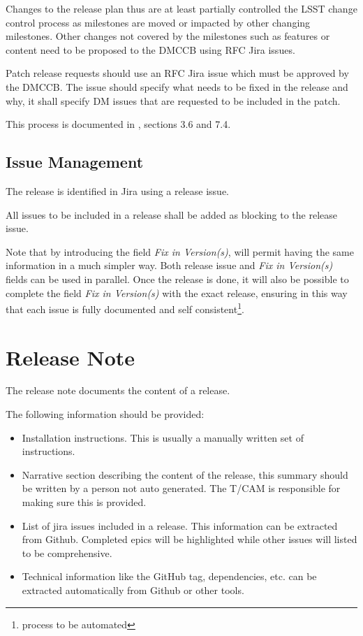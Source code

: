 Changes to the release plan  thus are  at least partially controlled the LSST change control  process as  milestones are moved or impacted by other changing milestones. Other changes not covered by the milestones such as features or content need to be proposed to the DMCCB using RFC Jira issues.

Patch release requests should use an RFC Jira issue which must be approved by the DMCCB.
The issue should specify what needs to be fixed in the release and why, it shall specify DM issues that are requested to be included in the patch.

This process is documented in , sections 3.6 and 7.4.


\subsection{Issue Management} \label{sec:issues}

The release is identified in Jira using a release issue.

All issues to be included in a release shall be added as blocking to the release issue.

Note that by introducing the field \textit{Fix in Version(s)}, will permit having the same information in a much simpler way.
Both release issue and \textit{Fix in Version(s)} fields can be used in parallel.
Once the release is done, it will also be possible to complete the field \textit{Fix in Version(s)} with the exact release,
ensuring in this way that each issue is fully documented and self consistent\footnote{process to be automated}.

\newpage
\section{Release Note} \label{sec:relnote}

The release note documents the content of a release.

The following information should be  provided:
\begin{itemize}
\item Installation instructions. This is usually a manually written set of instructions.
\item Narrative section describing the content of the release, this summary should be written by a person not auto generated.
The T/CAM is responsible for making sure this is provided.
\item List of jira issues included in a release. This information can be extracted from Github. Completed epics will be highlighted while other issues will  listed to be comprehensive.
\item Technical information like the GitHub tag, dependencies,  etc. can be extracted automatically from Github or other tools.
\end{itemize}


